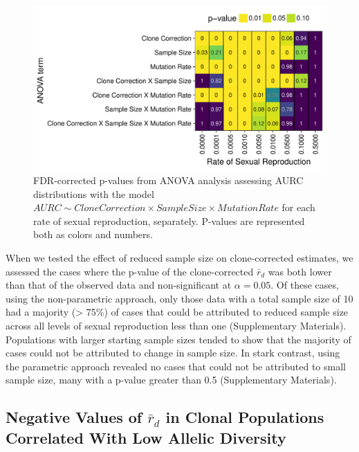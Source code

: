 \documentclass[]{article}
\theoremstyle{definition}
\theoremstyle{definition}
\theoremstyle{definition}
\theoremstyle{remark}
\begin{document}
\begin{figure}
\centering
\includegraphics[width=1.00000\textwidth]{figure/AURC_ANOVA.pdf}
\caption{FDR-corrected p-values from ANOVA analysis assessing AURC
distributions with the model
\(AURC \sim Clone Correction \times Sample Size \times Mutation Rate\)
for each rate of sexual reproduction, separately. P-values are
represented both as colors and numbers.}\label{fig:sim3}
\end{figure}

When we tested the effect of reduced sample size on clone-corrected
estimates, we assessed the cases where the p-value of the
clone-corrected \(\bar{r}_d\) was both lower than that of the observed
data and non-significant at \(\alpha = 0.05\). Of these cases, using the
non-parametric approach, only those data with a total sample size of 10
had a majority (\textgreater{} 75\%) of cases that could be attributed
to reduced sample size across all levels of sexual reproduction less
than one (Supplementary Materials). Populations with larger starting
sample sizes tended to show that the majority of cases could not be
attributed to change in sample size. In stark contrast, using the
parametric approach revealed no cases that could not be attributed to
small sample size, many with a p-value greater than 0.5 (Supplementary
Materials).

\subsection{\texorpdfstring{Negative Values of \(\bar{r}_d\) in Clonal
Populations Correlated With Low Allelic
Diversity}{Negative Values of \textbackslash{}bar\{r\}\_d in Clonal Populations Correlated With Low Allelic Diversity}}\label{negative-values-of-barr_d-in-clonal-populations-correlated-with-low-allelic-diversity}
\end{document}
